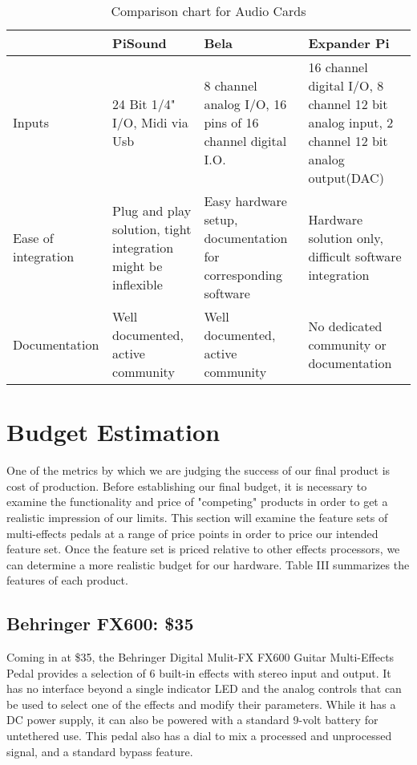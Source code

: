 \documentclass[journal,onecolumn,draftclsnofoot]{IEEEtran}
\begin{document}
\begin{table}[]
\centering
\raggedright
\begin{tabularx}{\linewidth}{X|X|X|X|}

 & PiSound & Bela & Expander Pi \\ \hline
Inputs & 24 Bit 1/4" I/O, Midi via Usb & 8 channel analog I/O, 16 pins of 16 channel digital I.O. & 16 channel digital I/O, 8 channel 12 bit analog input, 2 channel 12 bit analog output(DAC) \\ \hline
Ease of integration & Plug and play solution, tight integration might be inflexible & Easy hardware setup, documentation for corresponding software &
Hardware solution only, difficult software integration \\ \hline
Documentation & Well documented, active community & Well documented, active community & No dedicated community or documentation \\ \hline

\end{tabularx}
\vspace{.1cm}
\caption{Comparison chart for Audio Cards}
\label{my-label}
\end{table}

\section{Budget Estimation}
One of the metrics by which we are judging the success of our final product is cost of production. Before establishing our final budget, it is necessary to examine the functionality and price of "competing" products in order to get a realistic impression of our limits. This section will examine the feature sets of multi-effects pedals at a range of price points in order to price our intended feature set. Once the feature set is priced relative to other effects processors, we can determine a more realistic budget for our hardware. Table III summarizes the features of each product.

\subsection{Behringer FX600: \$35 \cite{bfx600}}
Coming in at \$35, the Behringer Digital Mulit-FX FX600 Guitar Multi-Effects Pedal provides a selection of 6 built-in effects with stereo input and output. It has no interface beyond a single indicator LED and the analog controls that can be used to select one of the effects and modify their parameters. While it has a DC power supply, it can also be powered with a standard 9-volt battery for untethered use. This pedal also has a dial to mix a processed and unprocessed signal, and a standard bypass feature.
\end{document}
